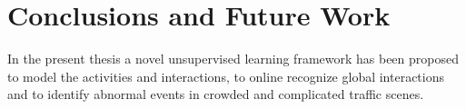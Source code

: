 \chapter{Conclusions and Future Work}
\label{chap:conclusion}
In the present thesis a novel unsupervised learning framework has been proposed to model the activities and interactions, to online recognize global interactions and to identify abnormal events in crowded and complicated traffic scenes. 
\cite{zhang2019graphical}